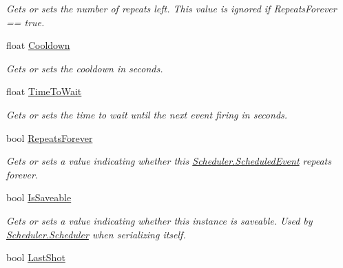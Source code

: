 \begin{DoxyCompactItemize}
\begin{DoxyCompactList}\small\item\em Gets or sets the number of repeats left. This value is ignored if Repeats\+Forever == true. \end{DoxyCompactList}\item 
float \hyperlink{class_scheduler_1_1_scheduled_event_a63e25b478be5eb402b6c53cb6ad96adc}{Cooldown}
\begin{DoxyCompactList}\small\item\em Gets or sets the cooldown in seconds. \end{DoxyCompactList}\item 
float \hyperlink{class_scheduler_1_1_scheduled_event_afb4173ede6077c7adf54950499164a45}{Time\+To\+Wait}
\begin{DoxyCompactList}\small\item\em Gets or sets the time to wait until the next event firing in seconds. \end{DoxyCompactList}\item 
bool \hyperlink{class_scheduler_1_1_scheduled_event_af7a0bb8b8b2962df9af5e549d1b3d178}{Repeats\+Forever}
\begin{DoxyCompactList}\small\item\em Gets or sets a value indicating whether this \hyperlink{class_scheduler_1_1_scheduled_event}{Scheduler.\+Scheduled\+Event} repeats forever. \end{DoxyCompactList}\item 
bool \hyperlink{class_scheduler_1_1_scheduled_event_a4ea0964dccdd458ff883edce11d6fac6}{Is\+Saveable}
\begin{DoxyCompactList}\small\item\em Gets or sets a value indicating whether this instance is saveable. Used by \hyperlink{class_scheduler_1_1_scheduler}{Scheduler.\+Scheduler} when serializing itself. \end{DoxyCompactList}\item 
bool \hyperlink{class_scheduler_1_1_scheduled_event_a1cb36619ff2480679def8c5d3a2770e8}{Last\+Shot}

\end{DoxyCompactItemize}
